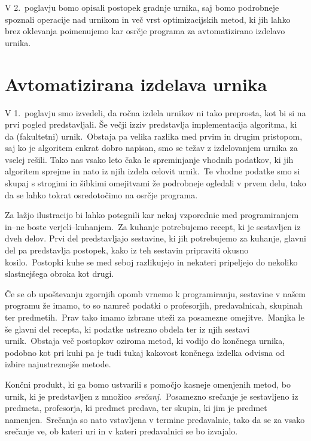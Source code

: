 \documentclass[a4paper,10pt]{article}
\begin{document}
V 2.\ poglavju bomo opisali postopek gradnje urnika, saj bomo podrobneje spoznali
operacije nad urnikom in več vrst optimizacijskih metod, ki jih lahko brez oklevanja
poimenujemo kar osrčje programa za avtomatizirano izdelavo urnika.

\section{Avtomatizirana izdelava urnika}

V 1.\ poglavju smo izvedeli, da ročna izdela urnikov ni tako preprosta, kot bi si
na prvi pogled predstavljali. Še večji izziv predstavlja implementacija algoritma, ki da
(fakultetni) urnik.\ Obstaja pa velika razlika med prvim in drugim pristopom, saj ko je
algoritem enkrat dobro napisan, smo se težav z izdelovanjem urnika za vselej rešili.
Tako nas vsako leto čaka le spreminjanje vhodnih podatkov, ki jih algoritem sprejme in
nato iz njih izdela celovit urnik.\ Te vhodne podatke smo si skupaj s strogimi in šibkimi
omejitvami že podrobneje ogledali v prvem delu, tako da se lahko tokrat osredotočimo na
osrčje programa.

Za lažjo ilustracijo bi lahko potegnili kar nekaj vzporednic med programiranjem in--ne
boste verjeli--kuhanjem.\ Za kuhanje potrebujemo recept, ki je sestavljen iz dveh delov.
Prvi del predstavljajo sestavine, ki jih potrebujemo za kuhanje, glavni del pa predstavlja
postopek, kako iz teh sestavin pripraviti okusno kosilo.\ Postopki kuhe se med seboj
razlikujejo in nekateri pripeljejo do nekoliko slastnejšega obroka kot drugi.

Če se ob upoštevanju zgornjih opomb vrnemo k programiranju, sestavine v našem programu že
imamo, to so namreč podatki o profesorjih, predavalnicah, skupinah ter predmetih.\ Prav tako
imamo izbrane uteži za posamezne omejitve.\ Manjka le še glavni del recepta, ki podatke
ustrezno obdela ter iz njih sestavi urnik.\ Obstaja več postopkov oziroma metod, ki vodijo
do končnega urnika, podobno kot pri kuhi pa je tudi tukaj kakovost končnega izdelka odvisna
od izbire najustreznejše metode.

Končni produkt, ki ga bomo ustvarili s pomočjo kasneje omenjenih metod, bo urnik, ki je
predstavljen z množico \emph{srečanj}.\ Posamezno srečanje je sestavljeno iz predmeta,
profesorja, ki predmet predava, ter skupin, ki jim je predmet namenjen.\ Srečanja so nato
vstavljena v termine predavalnic, tako da se za vsako srečanje ve, ob kateri uri in v
kateri predavalnici se bo izvajalo.
\end{document}
